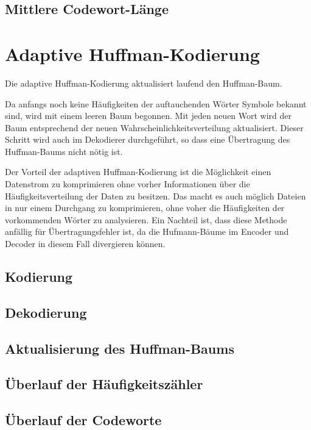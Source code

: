 \documentclass[twoside,11pt,a4paper]{article}
\theoremstyle{break}
\begin{document}
\subsection{Mittlere Codewort-Länge}


\section{Adaptive Huffman-Kodierung}
Die adaptive Huffman-Kodierung aktualisiert laufend den Huffman-Baum.

Da anfangs noch keine Häufigkeiten der auftauchenden Wörter Symbole
bekannt sind, wird mit einem leeren Baum begonnen. Mit jeden neuen
Wort wird der Baum entsprechend der neuen
Wahrscheinlichkeitsverteilung aktualisiert. Dieser Schritt wird auch
im Dekodierer durchgeführt, so dass eine Übertragung des Huffman-Baums
nicht nötig ist.

Der Vorteil der adaptiven Huffman-Kodierung ist die Möglichkeit einen
Datenstrom zu komprimieren ohne vorher Informationen über die
Häufigkeitsverteilung der Daten zu besitzen. Das macht es auch möglich
Dateien in nur einem Durchgang zu komprimieren, ohne voher die
Häufigkeiten der vorkommenden Wörter zu analysieren. Ein Nachteil ist,
dass diese Methode anfällig für Übertragungsfehler ist, da die
Hufmann-Bäume im Encoder und Decoder in diesem Fall divergieren können.

\subsection{Kodierung}

\subsection{Dekodierung}

\subsection{Aktualisierung des Huffman-Baums}


\subsection{Überlauf der Häufigkeitszähler}

\subsection{Überlauf der Codeworte}
\end{document}
